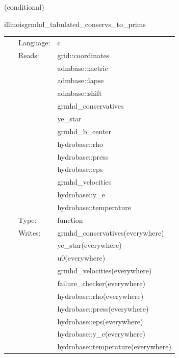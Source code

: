 \documentclass{article}
\begin{document}
\vspace{5mm}

   (conditional) 

\hspace{5mm} illinoisgrmhd\_tabulated\_conservs\_to\_prims 

\hspace{5mm}{\it tabulated version of illinoisgrmhd\_conservs\_to\_prims } 


\hspace{5mm}

 \begin{tabular*}{160mm}{cll} 
~ & Language:  & c \\ 
~ & Reads:  & grid::coordinates \\ 
~& ~ &admbase::metric\\ 
~& ~ &admbase::lapse\\ 
~& ~ &admbase::shift\\ 
~& ~ &grmhd\_conservatives\\ 
~& ~ &ye\_star\\ 
~& ~ &grmhd\_b\_center\\ 
~& ~ &hydrobase::rho\\ 
~& ~ &hydrobase::press\\ 
~& ~ &hydrobase::eps\\ 
~& ~ &grmhd\_velocities\\ 
~& ~ &hydrobase::y\_e\\ 
~& ~ &hydrobase::temperature\\ 
~ & Type:  & function \\ 
~ & Writes:  & grmhd\_conservatives(everywhere) \\ 
~& ~ &ye\_star(everywhere)\\ 
~& ~ &u0(everywhere)\\ 
~& ~ &grmhd\_velocities(everywhere)\\ 
~& ~ &failure\_checker(everywhere)\\ 
~& ~ &hydrobase::rho(everywhere)\\ 
~& ~ &hydrobase::press(everywhere)\\ 
~& ~ &hydrobase::eps(everywhere)\\ 
~& ~ &hydrobase::y\_e(everywhere)\\ 
~& ~ &hydrobase::temperature(everywhere)\\ 
\end{tabular*} 


\vspace{5mm}
\end{document}

